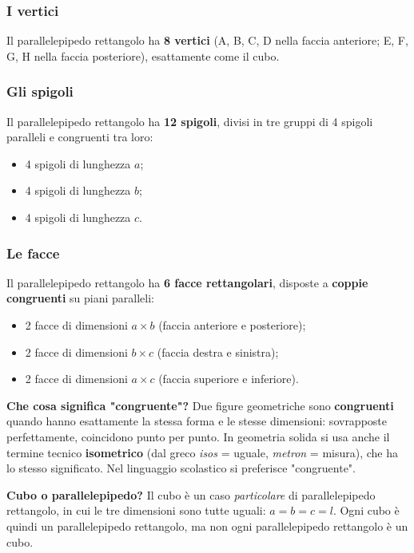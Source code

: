 \subsubsection{I vertici}
Il parallelepipedo rettangolo ha \textbf{8 vertici} (A, B, C, D nella faccia anteriore; E, F, G, H nella faccia posteriore), esattamente come il cubo.

\subsubsection{Gli spigoli}
Il parallelepipedo rettangolo ha \textbf{12 spigoli}, divisi in tre gruppi di 4 spigoli paralleli e congruenti tra loro:
\begin{itemize}[leftmargin=1.4em]
    \item 4 spigoli di lunghezza $a$;
    \item 4 spigoli di lunghezza $b$;
    \item 4 spigoli di lunghezza $c$.
\end{itemize}

\subsubsection{Le facce}
Il parallelepipedo rettangolo ha \textbf{6 facce rettangolari}, disposte a \textbf{coppie congruenti} su piani paralleli:

\begin{itemize}[leftmargin=1.4em]
    \item 2 facce di dimensioni $a \times b$ (faccia anteriore e posteriore);
    \item 2 facce di dimensioni $b \times c$ (faccia destra e sinistra);
    \item 2 facce di dimensioni $a \times c$ (faccia superiore e inferiore).
\end{itemize}

\medskip
\textbf{Che cosa significa "congruente"?} Due figure geometriche sono \textbf{congruenti} quando hanno esattamente la stessa forma e le stesse dimensioni: sovrapposte perfettamente, coincidono punto per punto. In geometria solida si usa anche il termine tecnico \textbf{isometrico} (dal greco \emph{isos} = uguale, \emph{metron} = misura), che ha lo stesso significato. Nel linguaggio scolastico si preferisce "congruente".

\begin{attenzione}
    \textbf{Cubo o parallelepipedo?} Il cubo è un caso \emph{particolare} di parallelepipedo rettangolo, in cui le tre dimensioni sono tutte uguali: $a = b = c = l$. Ogni cubo è quindi un parallelepipedo rettangolo, ma non ogni parallelepipedo rettangolo è un cubo.
\end{attenzione}

